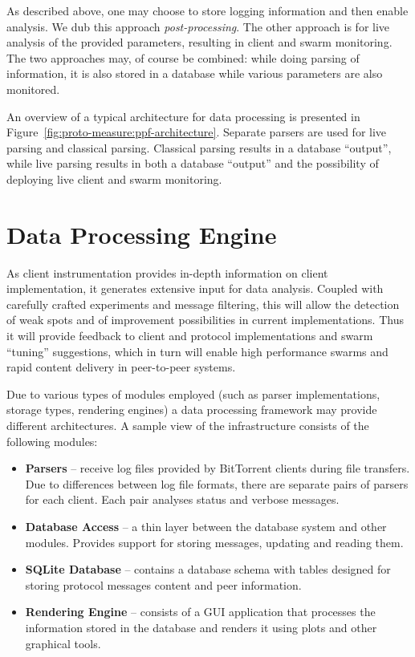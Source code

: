 As described above, one may choose to store logging information and then
enable analysis. We dub this approach \textit{post-processing}. The other
approach is for live analysis of the provided parameters, resulting in client
and swarm monitoring. The two approaches may, of course be combined: while
doing parsing of information, it is also stored in a database while various
parameters are also monitored.

An overview of a typical architecture for data processing is presented in
Figure~\ref{fig:proto-measure:ppf-architecture}. Separate parsers are used for live parsing and
classical parsing. Classical parsing results in a database ``output'', while
live parsing results in both a database ``output'' and the possibility of
deploying live client and swarm monitoring.

\section{Data Processing Engine}
\label{sec:proto-measure:data-processing}

As client instrumentation provides in-depth information on client
implementation, it generates extensive input for data analysis. Coupled
with carefully crafted experiments and message filtering, this will allow
the detection of weak spots and of improvement possibilities in current
implementations. Thus it will provide feedback to client and protocol
implementations and swarm ``tuning'' suggestions, which in turn will enable
high performance swarms and rapid content delivery in peer-to-peer systems.

Due to various types of modules employed (such as parser implementations,
storage types, rendering engines) a data processing framework may provide
different architectures. A sample view of the infrastructure consists of the
following modules:

\begin{itemize}
  \item \textbf{Parsers} -- receive log files provided by BitTorrent
clients during file transfers. Due to differences between log file formats,
there are separate pairs of parsers for each client. Each pair analyses status
and verbose messages.
  \item \textbf{Database Access} -- a thin layer between the database system and
other modules. Provides support for storing messages, updating and reading
them.
  \item \textbf{SQLite Database} -- contains a database schema with tables
designed for storing protocol messages content and peer information.
  \item \textbf{Rendering Engine} -- consists of a GUI application that
processes the information stored in the database and renders it using plots
and other graphical tools.
\end{itemize}

